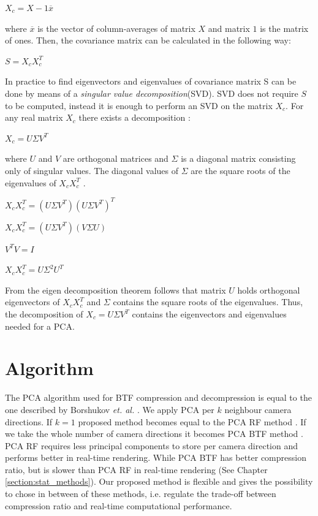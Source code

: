 {\centering$X_{c}=X-1\overline{x}$\\}

where $\overline{x}$ is the vector of column-averages of matrix $X$ and matrix $1$ is the matrix of ones.
Then, the covariance matrix can be calculated in the following way:

{\centering$S=X_{c}X_{c}^T$\\}


In practice to find eigenvectors and eigenvalues of covariance matrix S can be done by means of a \emph{singular value decomposition}(SVD).
SVD does not require $S$ to be computed, instead it is enough to perform an SVD on the matrix $X_{c}$.
For any real matrix $X_{c}$ there exists a decomposition \cite{svd}:

{\centering $X_{c}=U\Sigma V^{T}$ \\}

where $U$ and $V$ are orthogonal matrices and $\Sigma$ is a diagonal matrix consisting only of singular values.
The diagonal values of $\Sigma$ are the square roots of the eigenvalues of $X_{c}X_{c}^T$ \cite{Lecture12A}.


{\centering $X_{c}X_{c}^T=(U\Sigma V^{T})(U\Sigma V^{T})^T$ \\}

{\centering $X_{c}X_{c}^T=(U\Sigma V^{T})(V\Sigma U)$ \\}

{\centering $V^{T}V=I$ \\}

{\centering $X_{c}X_{c}^T=U\Sigma^2 U^{T}$ \\}

From the eigen decomposition theorem \cite{eigendecompostion} follows that matrix $U$ holds orthogonal eigenvectors of $X_{c}X_{c}^T$
and $\Sigma$ contains the square roots of the eigenvalues.
Thus, the decomposition of $X_{c}=U\Sigma V^{T}$ contains the eigenvectors and eigenvalues needed for a PCA.

\section{Algorithm}
\label{section:algorithm_step}
The PCA algorithm used for BTF compression and decompression is equal to the one described by Borshukov  \emph{et. al.} \cite[Ch.\ 15]{gpu_gems}.
We apply PCA per $k$ neighbour camera directions. 
 If $k=1$ proposed method becomes equal to the PCA RF method \cite{haindl}. 
If we take the whole number of camera directions it becomes PCA BTF method \cite{haindl}.
PCA RF requires less principal components to store per camera direction and performs better in real-time rendering. 
While PCA BTF has better compression ratio, but is slower than PCA RF in real-time rendering (See Chapter \ref{section:stat_methods}).
Our proposed method is flexible and gives the possibility to chose in between of these methods, i.e. regulate the trade-off between compression ratio and real-time computational performance.

